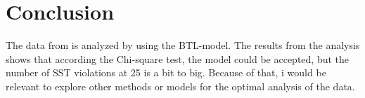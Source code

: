 \section*{Conclusion}
\label{Conclusion}
%
The data from \textcite{Ellermeier2004} is analyzed by using the BTL-model. The results from the analysis shows that according the Chi-square test, the model could be accepted, but the number of SST violations at 25 is a bit to big. Because of that, i would be relevant to explore other methods or models for the optimal analysis of the data. 